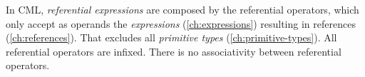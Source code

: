 In CML, \emph{referential expressions} are composed by the referential operators,
which only accept as operands the \emph{expressions} (\ref{ch:expressions})
resulting in references (\ref{ch:references}).
That excludes all \emph{primitive types} (\ref{ch:primitive-types}).
All referential operators are infixed.
There is no associativity between referential operators.
